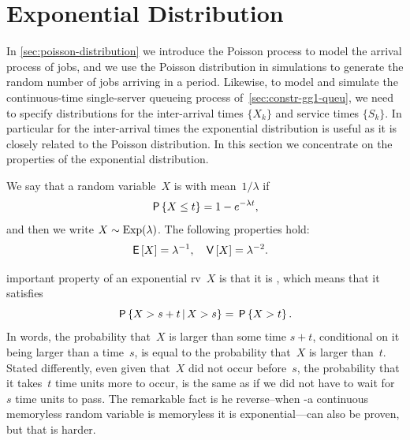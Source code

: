 \documentclass[queueing-book.tex]{subfiles}
\begin{document}
\section{Exponential Distribution}
\label{sec:expon-distr}

In \cref{sec:poisson-distribution} we introduce the Poisson process to model the arrival process of jobs, and we use the Poisson distribution in simulations to generate the random number of jobs arriving in a period.
Likewise, to model and simulate the continuous-time single-server queueing process of~\cref{sec:constr-gg1-queu}, we need to specify distributions for the inter-arrival times $\{X_k\}$ and service times $\{S_k\}$.
In particular for the inter-arrival times the exponential distribution is useful as it is closely related to the Poisson distribution.
In this section we concentrate on the properties of the  exponential distribution.




We say that a random variable~$X$ is  with mean~$1/\lambda$ if
\begin{equation*}
 \P{X \leq t} = 1- e^{-\lambda t},
\end{equation*}
and then we write $X\sim \Exp{\lambda}$. The following properties hold:
\begin{subequations}
  \begin{align}
  \E X &= \lambda^{-1},  &  %
\V X &= \lambda^{-2}. %
\end{align}
\end{subequations}


 important property of an exponential rv~$X$ is that it is , which means that it satisfies
\begin{equation*}
 \P{X > s+t \given X>s} = \P{X>t}.
\end{equation*}
In words, the probability that~$X$ is larger than some time $s+t$, conditional on it being larger than a time~$s$, is equal to the probability that~$X$ is larger than~$t$.
Stated differently, even given that~$X$ did not occur before~$s$, the probability that it takes~$t$ time units more to occur, is the same as if we did not have to wait for~$s$ time units to pass.
The remarkable fact is he reverse--when -a continuous memoryless random variable is memoryless it is exponential---can also be proven, but that is harder.
\end{document}
